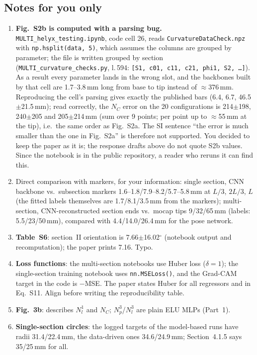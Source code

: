 \documentclass[10pt,a4paper]{article}
\begin{document}
\subsection{Notes for you only}\label{sec:private}
\begin{priv}
\begin{enumerate}
\item \label{priv:s2b}\textbf{Fig.~S2b is computed with a parsing bug.} \texttt{MULTI\_helyx\_testing.ipynb}, code cell 26, reads \texttt{CurvatureDataCheck.npz} with \texttt{np.hsplit(data, 5)}, which assumes the columns are grouped by parameter; the file is written grouped by section (\texttt{MULTI\_curvature\_checks.py}, l.\,594: \texttt{[S1, c01, c11, c21, phi1, S2, \dots]}). As a result every parameter lands in the wrong slot, and the backbones built by that cell are 1.7--3.8\,mm long from base to tip instead of $\approx$376\,mm. Reproducing the cell's parsing gives exactly the published bars (6.4, 6.7, 46.5$\pm$21.5\,mm); read correctly, the $N_C$ error on the 20 configurations is 214$\pm$198, 240$\pm$205 and 205$\pm$214\,mm (sum over 9 points; per point up to $\approx$55\,mm at the tip), i.e.\ the same order as Fig.~S2a. The SI sentence ``the error is much smaller than the one in Fig.~S2a'' is therefore not supported. You decided to keep the paper as it is; the response drafts above do not quote S2b values. Since the notebook is in the public repository, a reader who reruns it can find this.
\item Direct comparison with markers, for your information: single section, CNN backbone vs.\ subsection markers 1.6--1.8/7.9--8.2/5.7--5.8\,mm at $L/3$, $2L/3$, $L$ (the fitted labels themselves are 1.7/8.1/3.5\,mm from the markers); multi-section, CNN-reconstructed section ends vs.\ mocap tips 9/32/65\,mm (labels: 5.5/23/50\,mm), compared with 4.4/14.0/26.4\,mm for the pose network.
\item \textbf{Table~S6}: section~II orientation is 7.66$\pm$16.02$^\circ$ (notebook output and recomputation); the paper prints 7.16. Typo.
\item \textbf{Loss functions}: the multi-section notebooks use Huber loss ($\delta=1$); the single-section training notebook uses \texttt{nn.MSELoss()}, and the Grad-CAM target in the code is $-$MSE. The paper states Huber for all regressors and in Eq.~S11. Align before writing the reproducibility table.
\item \textbf{Fig.~3b}: describes $N_l^1$ and $N_C$; $N_p^3$/$N_l^3$ are plain ELU MLPs (Part~1).
\item \textbf{Single-section circles}: the logged targets of the model-based runs have radii 31.4/22.4\,mm, the data-driven ones 34.6/24.9\,mm; Section~4.1.5 says 35/25\,mm for all.

\end{enumerate}
\end{priv}
\end{document}
